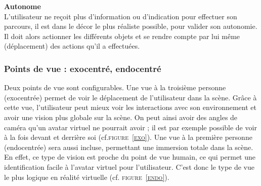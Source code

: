 \textbf{Autonome}
\\

L'utilisateur ne reçoit plus d'information ou d'indication pour effectuer son parcours, il est dans le décor le plus réaliste possible, pour valider son autonomie. Il doit alors actionner les différents objets et se rendre compte par lui même (déplacement) des actions qu'il a effectuées.

\subsubsection{Points de vue : exocentré, endocentré}

Deux points de vue sont configurables. Une vue à la troisième personne (exocentrée) permet de voir le déplacement de l'utilisateur dans la scène.
Grâce à cette vue, l'utilisateur peut mieux voir les interactions avec son environnement et avoir une vision plus globale sur la scène. 
On peut ainsi avoir des angles de caméra qu'un avatar virtuel ne pourrait avoir ; il est par exemple possible de voir à la fois devant et derrière soi (cf.\textsc{figure~\ref{exo}}).
\newline
Une vue à la première personne (endocentrée) sera aussi incluse, permettant une immersion totale dans la scène. 
En effet, ce type de vision est proche du point de vue humain, ce qui permet une identification facile à l'avatar virtuel pour l'utilisateur. C'est donc le type de vue le plus logique en réalité virtuelle (cf. \textsc{figure~\ref{endo}}).
